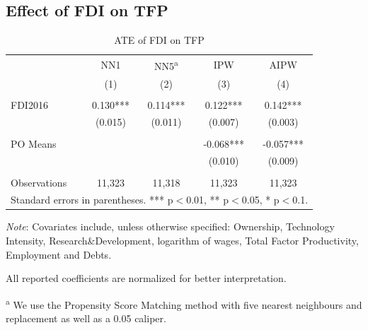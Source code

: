 \documentclass[a4paper,11pt]{scrartcl}
\begin{document}
\subsection{Effect of FDI on TFP}


\begin{table}[h]
 	\centering
   	\caption{ATE of FDI on TFP}
   	\label{tab:mainresults}
\begin{threeparttable}

\begin{tabular}{lcccc} 
	\hline
	\hline
 			& NN1 & NN5\textsuperscript{a} & IPW & AIPW \\
 			& (1) & (2) & (3)  & (4) \\ \hline
 			&  &  &  &    \\
FDI2016 	& 0.130*** & 0.114*** & 0.122***  & 0.142***   \\
 			& (0.015) & (0.011) & (0.007) &   (0.003)  \\
 	&  &  &  &    \\
PO Means 	& & & -0.068*** &  -0.057*** \\
			&  &  & (0.010)  &  (0.009) \\
			&  &  &  &    \\
 Observations & 11,323 & 11,318 & 11,323 & 11,323 \\ 
 	\hline
 	\hline
	\multicolumn{5}{c}{\footnotesize{Standard errors in parentheses. *** p$<$0.01, ** p$<$0.05, * p$<$0.1. }}
\end{tabular}

\begin{tablenotes}[flushleft]
      \footnotesize
\item \textit{Note}: Covariates include, unless otherwise specified: Ownership, Technology Intensity, Research\&Development, logarithm of wages, Total Factor Productivity, Employment and Debts. 
\item All reported coefficients are normalized for better interpretation. %
\item\textsuperscript{a} We use the Propensity Score Matching method with five nearest neighbours and replacement as well as a 0.05 caliper. 
\end{tablenotes}

\end{threeparttable}
\end{table}
\end{document}
